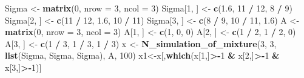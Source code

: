 \documentclass[
]{article}
\newenvironment{Shaded}{\begin{snugshade}}{\end{snugshade}}
\newcommand{\AttributeTok}[1]{\textcolor[rgb]{0.13,0.29,0.53}{#1}}
\newcommand{\DecValTok}[1]{\textcolor[rgb]{0.00,0.00,0.81}{#1}}
\newcommand{\FloatTok}[1]{\textcolor[rgb]{0.00,0.00,0.81}{#1}}
\newcommand{\FunctionTok}[1]{\textcolor[rgb]{0.13,0.29,0.53}{\textbf{#1}}}
\newcommand{\NormalTok}[1]{#1}
\newcommand{\OtherTok}[1]{\textcolor[rgb]{0.56,0.35,0.01}{#1}}
\newcommand{\SpecialCharTok}[1]{\textcolor[rgb]{0.81,0.36,0.00}{\textbf{#1}}}
\begin{document}
\begin{Shaded}
\begin{Highlighting}[]
\NormalTok{Sigma }\OtherTok{\textless{}{-}} \FunctionTok{matrix}\NormalTok{(}\DecValTok{0}\NormalTok{, }\AttributeTok{nrow =} \DecValTok{3}\NormalTok{, }\AttributeTok{ncol =} \DecValTok{3}\NormalTok{)}
\NormalTok{Sigma[}\DecValTok{1}\NormalTok{, ] }\OtherTok{\textless{}{-}} \FunctionTok{c}\NormalTok{(}\FloatTok{1.6}\NormalTok{, }\DecValTok{11} \SpecialCharTok{/} \DecValTok{12}\NormalTok{, }\DecValTok{8} \SpecialCharTok{/} \DecValTok{9}\NormalTok{)}
\NormalTok{Sigma[}\DecValTok{2}\NormalTok{, ] }\OtherTok{\textless{}{-}} \FunctionTok{c}\NormalTok{(}\DecValTok{11} \SpecialCharTok{/} \DecValTok{12}\NormalTok{, }\FloatTok{1.6}\NormalTok{, }\DecValTok{10} \SpecialCharTok{/} \DecValTok{11}\NormalTok{)}
\NormalTok{Sigma[}\DecValTok{3}\NormalTok{, ] }\OtherTok{\textless{}{-}} \FunctionTok{c}\NormalTok{(}\DecValTok{8} \SpecialCharTok{/} \DecValTok{9}\NormalTok{, }\DecValTok{10} \SpecialCharTok{/} \DecValTok{11}\NormalTok{, }\FloatTok{1.6}\NormalTok{)}
\NormalTok{A }\OtherTok{\textless{}{-}} \FunctionTok{matrix}\NormalTok{(}\DecValTok{0}\NormalTok{, }\AttributeTok{nrow =} \DecValTok{3}\NormalTok{, }\AttributeTok{ncol =} \DecValTok{3}\NormalTok{)}
\NormalTok{A[}\DecValTok{1}\NormalTok{, ] }\OtherTok{\textless{}{-}} \FunctionTok{c}\NormalTok{(}\DecValTok{1}\NormalTok{, }\DecValTok{0}\NormalTok{, }\DecValTok{0}\NormalTok{)}
\NormalTok{A[}\DecValTok{2}\NormalTok{, ] }\OtherTok{\textless{}{-}} \FunctionTok{c}\NormalTok{(}\DecValTok{1} \SpecialCharTok{/} \DecValTok{2}\NormalTok{, }\DecValTok{1} \SpecialCharTok{/} \DecValTok{2}\NormalTok{, }\DecValTok{0}\NormalTok{)}
\NormalTok{A[}\DecValTok{3}\NormalTok{, ] }\OtherTok{\textless{}{-}} \FunctionTok{c}\NormalTok{(}\DecValTok{1} \SpecialCharTok{/} \DecValTok{3}\NormalTok{, }\DecValTok{1} \SpecialCharTok{/} \DecValTok{3}\NormalTok{, }\DecValTok{1} \SpecialCharTok{/} \DecValTok{3}\NormalTok{)}
\NormalTok{x }\OtherTok{\textless{}{-}} \FunctionTok{N\_simulation\_of\_mixture}\NormalTok{(}\DecValTok{3}\NormalTok{, }\DecValTok{3}\NormalTok{, }\FunctionTok{list}\NormalTok{(Sigma, Sigma, Sigma), A, }\DecValTok{100}\NormalTok{)}
\NormalTok{x1}\OtherTok{\textless{}{-}}\NormalTok{x[,}\FunctionTok{which}\NormalTok{(x[}\DecValTok{1}\NormalTok{,]}\SpecialCharTok{\textgreater{}{-}}\DecValTok{1} \SpecialCharTok{\&}\NormalTok{ x[}\DecValTok{2}\NormalTok{,]}\SpecialCharTok{\textgreater{}{-}}\DecValTok{1} \SpecialCharTok{\&}\NormalTok{ x[}\DecValTok{3}\NormalTok{,]}\SpecialCharTok{\textgreater{}{-}}\DecValTok{1}\NormalTok{)]}



\end{Highlighting}
\end{Shaded}
\end{document}
